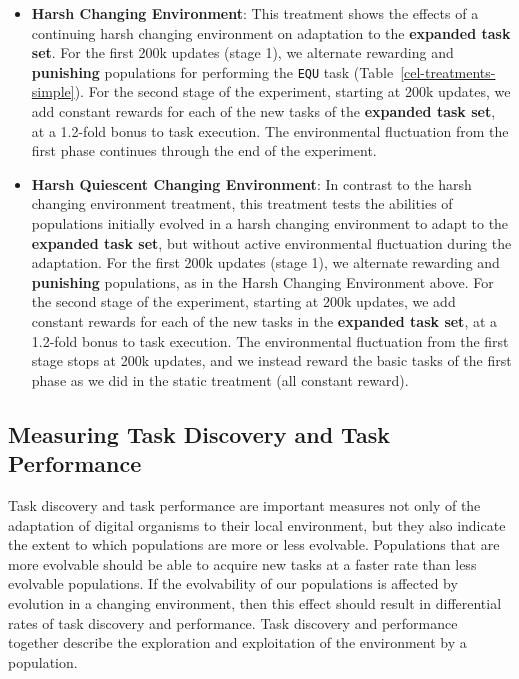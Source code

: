 \documentclass[10pt,letterpaper]{article}
\begin{document}
\begin{itemize}
	\item \textbf{Harsh Changing Environment}: This treatment shows the effects of a continuing harsh changing environment on adaptation to the \textbf{expanded task set}. For the first 200k updates (stage 1), we alternate rewarding and \textbf{punishing} populations for performing the \texttt{EQU} task (Table~\ref{cel-treatments-simple}). For the second stage of the experiment, starting at 200k updates, we add constant rewards for each of the new tasks of the \textbf{expanded task set}, at a 1.2-fold bonus to task execution. The environmental fluctuation from the first phase continues through the end of the experiment.

	\item \textbf{Harsh Quiescent Changing Environment}: In contrast to the harsh changing environment treatment, this treatment tests the abilities of populations initially evolved in a harsh changing environment to adapt to the \textbf{expanded task set}, but without active environmental fluctuation during the adaptation. For the first 200k updates (stage 1), we alternate rewarding and \textbf{punishing} populations, as in the Harsh Changing Environment above. For the second stage of the experiment, starting at 200k updates, we add constant rewards for each of the new tasks in the \textbf{expanded task set}, at a 1.2-fold bonus to task execution. The environmental fluctuation from the first stage stops at 200k updates, and we instead reward the basic tasks of the first phase as we did in the static treatment (all constant reward).
\end{itemize}




\subsection*{Measuring Task Discovery and Task Performance}
Task discovery and task performance are important measures not only of the adaptation of digital organisms to their local environment, but they also indicate the extent to which populations are more or less evolvable. Populations that are more evolvable should be able to acquire new tasks at a faster rate than less evolvable populations. If the evolvability of our populations is affected by evolution in a changing environment, then this effect should result in differential rates of task discovery and performance. Task discovery and performance together describe the exploration and exploitation of the environment by a population. 
\end{document}
